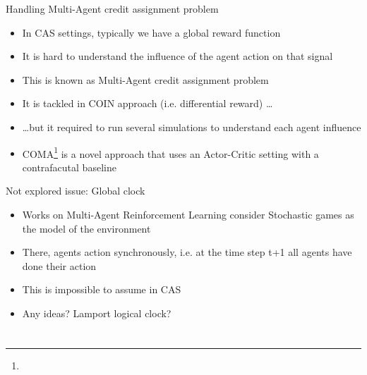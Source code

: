 \documentclass[presentation]{beamer}\mode<presentation>{\usetheme{AMSBolognaFC}}
\begin{document}
\begin{frame}{Handling Multi-Agent credit assignment problem}
	\begin{exampleblock}{}
		\begin{itemize}
			\item In CAS settings, typically we have a global reward function
			\item[{\color{red} \faThumbsDown}] It is hard to understand the influence of the agent action on that signal
			\item This is known as Multi-Agent credit assignment problem
			\item It is tackled in COIN approach (i.e. differential reward) \dots
			\item \dots but it required to run several simulations to understand each agent influence
			\item COMA\footnote[frame]{} is a novel approach that uses an Actor-Critic setting with a contrafacutal baseline 
		\end{itemize}
	\end{exampleblock}
\end{frame}

\begin{frame}{Not explored issue: Global clock}
	\begin{exampleblock}{}
		\begin{itemize}
			\item Works on Multi-Agent Reinforcement Learning consider Stochastic games as the model of the environment
			\item There, agents action synchronously, i.e. at the time step t+1 all agents have done their action
			\item This is impossible to assume in CAS
			\item Any ideas? Lamport logical clock?
		\end{itemize}
	\end{exampleblock}
\end{frame}


\section*{}
\end{document}
